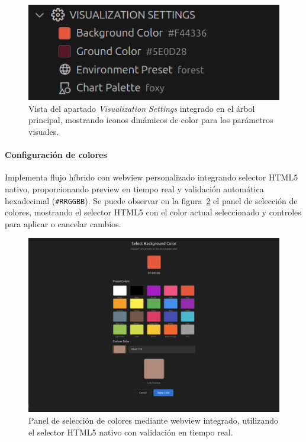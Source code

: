 \documentclass[a4paper, 12pt]{book}
\begin{document}
\begin{figure}[H]
\centering
\includegraphics[width=0.60\linewidth]{img/ui-visualization-settings-tree.png}
\caption{Vista del apartado \emph{Visualization Settings} integrado en el árbol principal, mostrando iconos dinámicos de color para los parámetros visuales.}
\label{fig:ui-visualization-settings-tree}
\end{figure}

\paragraph{Configuración de colores}
Implementa flujo híbrido con webview personalizado integrando selector HTML5 nativo, proporcionando preview en tiempo real y validación automática hexadecimal (\texttt{\#RRGGBB}). Se puede observar en la figura~\ref{fig:ui-color-picker-panel} el panel de selección de colores, mostrando el selector HTML5 con el color actual seleccionado y controles para aplicar o cancelar cambios.

\begin{figure}[H]
\centering
\includegraphics[width=0.60\linewidth]{img/ui-color-picker-panel.png}
\caption{Panel de selección de colores mediante webview integrado, utilizando el selector HTML5 nativo con validación en tiempo real.}
\label{fig:ui-color-picker-panel}
\end{figure}
\end{document}
